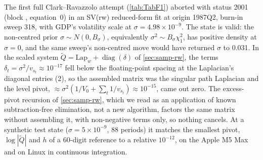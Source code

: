 The first full Clark--Ravazzolo attempt (\cref{tab:TabF1}) aborted with status 2001 (block , equation~0) in an SV(rw) reduced-form fit at origin 1987Q2, burn-in sweep 318, with GDP's volatility scale at $\sigma = 4.98\times10^{-9}$. %
The state is valid: the non-centred prior $\sigma \sim N(0, B_\sigma)$, equivalently $\sigma^2 \sim B_\sigma\chi^2_1$, has positive density at $\sigma = 0$, and the same sweep's non-centred move would have returned $\sigma$ to 0.031. %
In the scaled system $\tilde Q = \mathrm{Lap}_w + \operatorname{diag}(\delta)$ of \cref{sec:samp-rw}, the terms $\delta_t = \sigma^2/v_{s_t} \approx 10^{-17}$ fell below the floating-point spacing at the Laplacian's diagonal entries (2), so the assembled matrix was the singular path Laplacian and the level pivot, $\approx \sigma^2(1/V_0 + \sum_t 1/v_{s_t}) \approx 10^{-15}$, came out zero. %
The excess-pivot recursion of \cref{sec:samp-rw}, which we read as an application of known subtraction-free elimination, not a new algorithm, factors the same matrix without assembling it, with non-negative terms only, so nothing cancels. %
At a synthetic test state ($\sigma = 5\times10^{-9}$, 88 periods) it matches the smallest pivot, $\log|\tilde Q|$ and $h$ of a 60-digit reference to a relative $10^{-12}$, on the Apple M5 Max and on Linux in continuous integration. %

